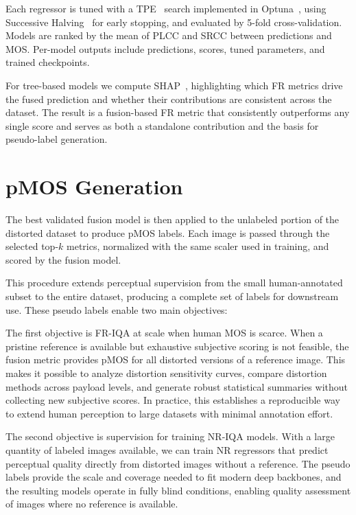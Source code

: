Each regressor is tuned with a \acf{TPE}~\cite{tpe} search implemented in Optuna~\cite{optuna}, using Successive Halving~\cite{pruner} for early stopping, and evaluated by 5-fold cross-validation. Models are ranked by the mean of \acs{PLCC} and \acs{SRCC} between predictions and \acs{MOS}. Per-model outputs include predictions, scores, tuned parameters, and trained checkpoints.

For tree-based models we compute \acf{SHAP}~\cite{shap}, highlighting which \acs{FR} metrics drive the fused prediction and whether their contributions are consistent across the dataset. The result is a fusion-based \acs{FR} metric that consistently outperforms any single score and serves as both a standalone contribution and the basis for pseudo-label generation.

\section{\acl{pMOS} Generation}

The best validated fusion model is then applied to the unlabeled portion of the distorted dataset to produce \acs{pMOS} labels. Each image is passed through the selected top-$k$ metrics, normalized with the same scaler used in training, and scored by the fusion model.

This procedure extends perceptual supervision from the small human-annotated subset to the entire dataset, producing a complete set of labels for downstream use. These pseudo labels enable two main objectives:

The first objective is \acs{FR-IQA} at scale when human \acs{MOS} is scarce. When a pristine reference is available but exhaustive subjective scoring is not feasible, the fusion metric provides \acs{pMOS} for all distorted versions of a reference image. This makes it possible to analyze distortion sensitivity curves, compare distortion methods across payload levels, and generate robust statistical summaries without collecting new subjective scores. In practice, this establishes a reproducible way to extend human perception to large datasets with minimal annotation effort.

The second objective is supervision for training \acs{NR-IQA} models. With a large quantity of labeled images available, we can train \acs{NR} regressors that predict perceptual quality directly from distorted images without a reference. The pseudo labels provide the scale and coverage needed to fit modern deep backbones, and the resulting models operate in fully blind conditions, enabling quality assessment of images where no reference is available.

